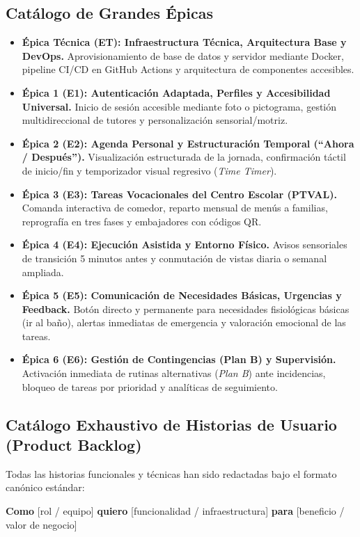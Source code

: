 \documentclass[11pt,a4paper]{article}
\begin{document}
\subsection{Catálogo de Grandes Épicas}
\begin{itemize}
\item \textbf{Épica Técnica (ET): Infraestructura Técnica, Arquitectura Base y DevOps.} Aprovisionamiento de base de datos y servidor mediante Docker, pipeline CI/CD en GitHub Actions y arquitectura de componentes accesibles.
\item \textbf{Épica 1 (E1): Autenticación Adaptada, Perfiles y Accesibilidad Universal.} Inicio de sesión accesible mediante foto o pictograma, gestión multidireccional de tutores y personalización sensorial/motriz.
\item \textbf{Épica 2 (E2): Agenda Personal y Estructuración Temporal (``Ahora / Después'').} Visualización estructurada de la jornada, confirmación táctil de inicio/fin y temporizador visual regresivo (\textit{Time Timer}).
\item \textbf{Épica 3 (E3): Tareas Vocacionales del Centro Escolar (PTVAL).} Comanda interactiva de comedor, reparto mensual de menús a familias, reprografía en tres fases y embajadores con códigos QR.
\item \textbf{Épica 4 (E4): Ejecución Asistida y Entorno Físico.} Avisos sensoriales de transición 5 minutos antes y conmutación de vistas diaria o semanal ampliada.
\item \textbf{Épica 5 (E5): Comunicación de Necesidades Básicas, Urgencias y Feedback.} Botón directo y permanente para necesidades fisiológicas básicas (ir al baño), alertas inmediatas de emergencia y valoración emocional de las tareas.
\item \textbf{Épica 6 (E6): Gestión de Contingencias (Plan B) y Supervisión.} Activación inmediata de rutinas alternativas (\textit{Plan B}) ante incidencias, bloqueo de tareas por prioridad y analíticas de seguimiento.
\end{itemize}

\subsection{Catálogo Exhaustivo de Historias de Usuario (Product Backlog)}
Todas las historias funcionales y técnicas han sido redactadas bajo el formato canónico estándar:

\textbf{Como} [rol / equipo] \quad \textbf{quiero} [funcionalidad / infraestructura] \quad \textbf{para} [beneficio / valor de negocio]
\end{document}
